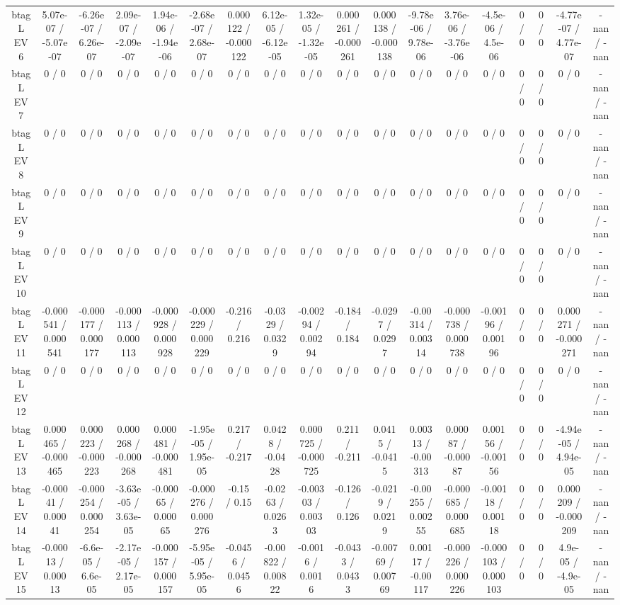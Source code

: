\documentclass[10pt]{article}
\begin{document}
\begin{table}[htbp]
\begin{center}
\begin{tabular}{|c|c|c|c|c|c|c|c|c|c|c|c|c|c|c|c|c|c|}
  btag L EV 6 & 5.07e-07 / -5.07e-07 & -6.26e-07 / 6.26e-07 & 2.09e-07 / -2.09e-07 & 1.94e-06 / -1.94e-06 & -2.68e-07 / 2.68e-07 & 0.000122 / -0.000122 & 6.12e-05 / -6.12e-05 & 1.32e-05 / -1.32e-05 & 0.000261 / -0.000261 & 0.000138 / -0.000138 & -9.78e-06 / 9.78e-06 & 3.76e-06 / -3.76e-06 & -4.5e-06 / 4.5e-06 & 0 / 0 & 0 / 0 & -4.77e-07 / 4.77e-07 & -nan / -nan \\ 
  btag L EV 7 & 0 / 0 & 0 / 0 & 0 / 0 & 0 / 0 & 0 / 0 & 0 / 0 & 0 / 0 & 0 / 0 & 0 / 0 & 0 / 0 & 0 / 0 & 0 / 0 & 0 / 0 & 0 / 0 & 0 / 0 & 0 / 0 & -nan / -nan \\ 
  btag L EV 8 & 0 / 0 & 0 / 0 & 0 / 0 & 0 / 0 & 0 / 0 & 0 / 0 & 0 / 0 & 0 / 0 & 0 / 0 & 0 / 0 & 0 / 0 & 0 / 0 & 0 / 0 & 0 / 0 & 0 / 0 & 0 / 0 & -nan / -nan \\ 
  btag L EV 9 & 0 / 0 & 0 / 0 & 0 / 0 & 0 / 0 & 0 / 0 & 0 / 0 & 0 / 0 & 0 / 0 & 0 / 0 & 0 / 0 & 0 / 0 & 0 / 0 & 0 / 0 & 0 / 0 & 0 / 0 & 0 / 0 & -nan / -nan \\ 
  btag L EV 10 & 0 / 0 & 0 / 0 & 0 / 0 & 0 / 0 & 0 / 0 & 0 / 0 & 0 / 0 & 0 / 0 & 0 / 0 & 0 / 0 & 0 / 0 & 0 / 0 & 0 / 0 & 0 / 0 & 0 / 0 & 0 / 0 & -nan / -nan \\ 
  btag L EV 11 & -0.000541 / 0.000541 & -0.000177 / 0.000177 & -0.000113 / 0.000113 & -0.000928 / 0.000928 & -0.000229 / 0.000229 & -0.216 / 0.216 & -0.0329 / 0.0329 & -0.00294 / 0.00294 & -0.184 / 0.184 & -0.0297 / 0.0297 & -0.00314 / 0.00314 & -0.000738 / 0.000738 & -0.00196 / 0.00196 & 0 / 0 & 0 / 0 & 0.000271 / -0.000271 & -nan / -nan \\ 
  btag L EV 12 & 0 / 0 & 0 / 0 & 0 / 0 & 0 / 0 & 0 / 0 & 0 / 0 & 0 / 0 & 0 / 0 & 0 / 0 & 0 / 0 & 0 / 0 & 0 / 0 & 0 / 0 & 0 / 0 & 0 / 0 & 0 / 0 & -nan / -nan \\ 
  btag L EV 13 & 0.000465 / -0.000465 & 0.000223 / -0.000223 & 0.000268 / -0.000268 & 0.000481 / -0.000481 & -1.95e-05 / 1.95e-05 & 0.217 / -0.217 & 0.0428 / -0.0428 & 0.000725 / -0.000725 & 0.211 / -0.211 & 0.0415 / -0.0415 & 0.00313 / -0.00313 & 0.00087 / -0.00087 & 0.00156 / -0.00156 & 0 / 0 & 0 / 0 & -4.94e-05 / 4.94e-05 & -nan / -nan \\ 
  btag L EV 14 & -0.00041 / 0.00041 & -0.000254 / 0.000254 & -3.63e-05 / 3.63e-05 & -0.00065 / 0.00065 & -0.000276 / 0.000276 & -0.15 / 0.15 & -0.0263 / 0.0263 & -0.00303 / 0.00303 & -0.126 / 0.126 & -0.0219 / 0.0219 & -0.00255 / 0.00255 & -0.000685 / 0.000685 & -0.00118 / 0.00118 & 0 / 0 & 0 / 0 & 0.000209 / -0.000209 & -nan / -nan \\ 
  btag L EV 15 & -0.00013 / 0.00013 & -6.6e-05 / 6.6e-05 & -2.17e-05 / 2.17e-05 & -0.000157 / 0.000157 & -5.95e-05 / 5.95e-05 & -0.0456 / 0.0456 & -0.00822 / 0.00822 & -0.0016 / 0.0016 & -0.0433 / 0.0433 & -0.00769 / 0.00769 & 0.00117 / -0.00117 & -0.000226 / 0.000226 & -0.000103 / 0.000103 & 0 / 0 & 0 / 0 & 4.9e-05 / -4.9e-05 & -nan / -nan \\ 

\end{tabular}
\end{center}
\end{table}
\end{document}
